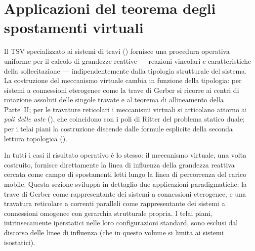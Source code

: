 \section{Applicazioni del teorema degli spostamenti virtuali}
\label{sec:applicazioni_TSV}

Il TSV specializzato ai sistemi di travi
() fornisce una procedura
operativa uniforme per il calcolo di grandezze reattive
--- reazioni vincolari e caratteristiche della
sollecitazione --- indipendentemente dalla tipologia
strutturale del sistema. La costruzione del meccanismo
virtuale cambia in funzione della tipologia: per sistemi
a connessioni eterogenee come la trave di Gerber si
ricorre ai centri di rotazione assoluti delle singole
travate e al teorema di allineamento della
Parte~II; per le travature reticolari i meccanismi
virtuali si articolano attorno ai \emph{poli delle aste}
(), che coincidono con i poli di
Ritter del problema statico duale; per i telai piani la
costruzione discende dalle formule esplicite della
seconda lettura topologica ().

In tutti i casi il risultato operativo è lo stesso: il
meccanismo virtuale, una volta costruito, fornisce
direttamente la linea di influenza della grandezza
reattiva cercata come campo di spostamenti letti lungo
la linea di percorrenza del carico mobile. Questa
sezione sviluppa in dettaglio due applicazioni
paradigmatiche: la trave di Gerber come rappresentante
dei sistemi a connessioni eterogenee, e una travatura
reticolare a correnti paralleli come rappresentante dei
sistemi a connessioni omogenee con gerarchia
strutturale propria. I telai piani, intrinsecamente
iperstatici nelle loro configurazioni standard, sono
esclusi dal discorso delle linee di influenza (che in
questo volume si limita ai sistemi isostatici).



